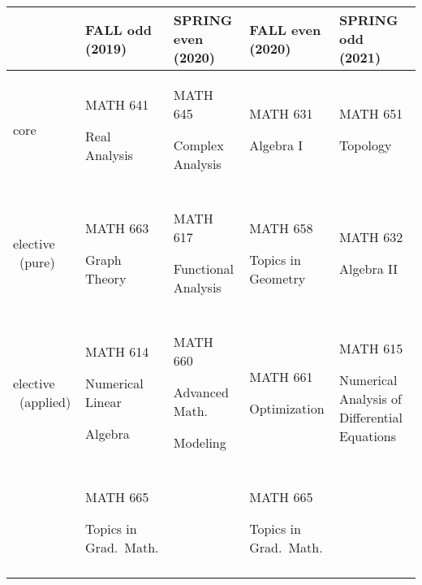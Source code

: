 \documentclass[12pt]{report}
\begin{document}
\pagestyle{empty}

\small
\begin{center}
\begin{tabular}{| p{1.6cm} || p{3.9cm} | p{3.9cm} | p{3.9cm} | p{3.9cm} |}

\hline
& \textbf{FALL odd (2019)} & \textbf{SPRING even (2020)} & \textbf{FALL even (2020)} & \textbf{SPRING odd (2021)} \\
\hline\hline
core & MATH 641 \par Real Analysis & MATH 645 \par Complex Analysis & MATH 631 \par Algebra I & MATH 651 \par Topology \\
&  &&&\\
\hline
elective 
~(pure) & MATH 663 \par Graph Theory & MATH 617 \par Functional Analysis & MATH 658 \par Topics in Geometry & MATH 632 \par Algebra II \\
&  &&  & \\
\hline
elective 
~(applied) & MATH 614 \par Numerical Linear \par Algebra & MATH 660 \par Advanced Math. \par Modeling & MATH 661 \par Optimization & MATH 615 \par Numerical Analysis of Differential Equations \\
&  &&  & \\
\hline
& MATH 665 \par Topics in Grad.~Math. && MATH 665 \par Topics in Grad.~Math. &\\
&  &&  &\\
\hline
\end{tabular}
\end{center}
\end{document}
